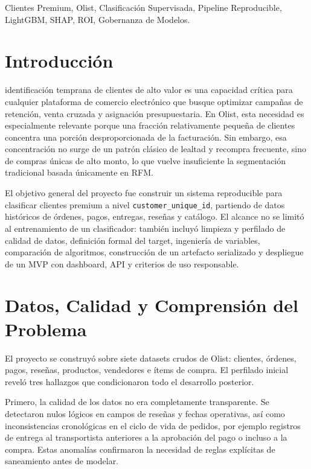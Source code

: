 \documentclass[journal,letterpaper]{IEEEtran}
\begin{document}
\begin{IEEEkeywords}
Clientes Premium, Olist, Clasificación Supervisada, Pipeline Reproducible, LightGBM, SHAP, ROI, Gobernanza de Modelos.
\end{IEEEkeywords}

\section{Introducción}
 identificación temprana de clientes de alto valor es una capacidad crítica para cualquier plataforma de comercio electrónico que busque optimizar campañas de retención, venta cruzada y asignación presupuestaria. En Olist, esta necesidad es especialmente relevante porque una fracción relativamente pequeña de clientes concentra una porción desproporcionada de la facturación. Sin embargo, esa concentración no surge de un patrón clásico de lealtad y recompra frecuente, sino de compras únicas de alto monto, lo que vuelve insuficiente la segmentación tradicional basada únicamente en RFM.

El objetivo general del proyecto fue construir un sistema reproducible para clasificar clientes premium a nivel \texttt{customer\_unique\_id}, partiendo de datos históricos de órdenes, pagos, entregas, reseñas y catálogo. El alcance no se limitó al entrenamiento de un clasificador: también incluyó limpieza y perfilado de calidad de datos, definición formal del target, ingeniería de variables, comparación de algoritmos, construcción de un artefacto serializado y despliegue de un MVP con dashboard, API y criterios de uso responsable.

\section{Datos, Calidad y Comprensión del Problema}
El proyecto se construyó sobre siete datasets crudos de Olist: clientes, órdenes, pagos, reseñas, productos, vendedores e ítems de compra. El perfilado inicial reveló tres hallazgos que condicionaron todo el desarrollo posterior.

Primero, la calidad de los datos no era completamente transparente. Se detectaron nulos lógicos en campos de reseñas y fechas operativas, así como inconsistencias cronológicas en el ciclo de vida de pedidos, por ejemplo registros de entrega al transportista anteriores a la aprobación del pago o incluso a la compra. Estas anomalías confirmaron la necesidad de reglas explícitas de saneamiento antes de modelar.
\end{document}
